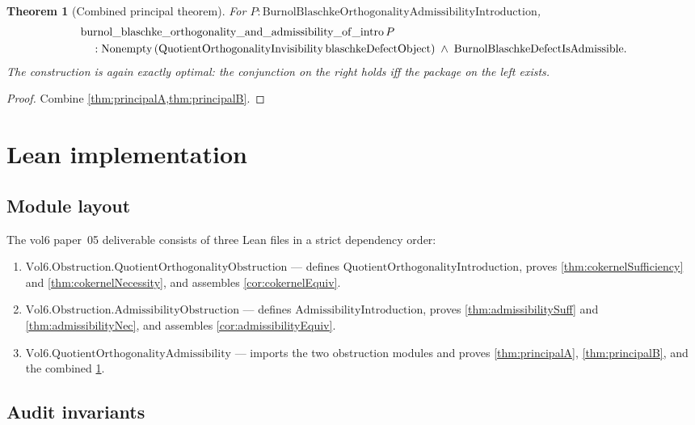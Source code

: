 \documentclass[12pt]{article}
\newtheorem{theorem}{Theorem}[section]
\theoremstyle{definition}
\theoremstyle{remark}
\begin{document}
\begin{theorem}[Combined principal theorem]\label{thm:combinedPrincipal}
For $P : \mathrm{BurnolBlaschkeOrthogonalityAdmissibilityIntroduction}$,
\begin{align}
  &\mathrm{burnol\_blaschke\_orthogonality\_and\_admissibility\_of\_intro}\,P \notag\\
  &\quad : \mathrm{Nonempty}\,(\mathrm{QuotientOrthogonalityInvisibility}\,\mathrm{blaschkeDefectObject})
  \;\wedge\;
  \mathrm{BurnolBlaschkeDefectIsAdmissible}.
  \label{eq:combinedThm}
\end{align}
The construction is again exactly optimal: the conjunction on the right holds iff the package on the left exists.
\end{theorem}

\begin{proof}
Combine \cref{thm:principalA,thm:principalB}.
\end{proof}

\section{Lean implementation}\label{sec:lean}

\subsection{Module layout}

The vol6 paper~05 deliverable consists of three Lean files in a strict dependency order:
\begin{enumerate}
  \item $\mathrm{Vol6.Obstruction.QuotientOrthogonalityObstruction}$ --- defines $\mathrm{QuotientOrthogonalityIntroduction}$, proves \cref{thm:cokernelSufficiency} and \cref{thm:cokernelNecessity}, and assembles \cref{cor:cokernelEquiv}.
  \item $\mathrm{Vol6.Obstruction.AdmissibilityObstruction}$ --- defines $\mathrm{AdmissibilityIntroduction}$, proves \cref{thm:admissibilitySuff} and \cref{thm:admissibilityNec}, and assembles \cref{cor:admissibilityEquiv}.
  \item $\mathrm{Vol6.QuotientOrthogonalityAdmissibility}$ --- imports the two obstruction modules and proves \cref{thm:principalA}, \cref{thm:principalB}, and the combined \cref{thm:combinedPrincipal}.
\end{enumerate}

\subsection{Audit invariants}
\end{document}
